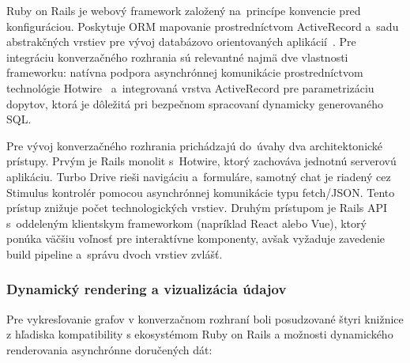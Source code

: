 Ruby on Rails je webový framework založený na~princípe konvencie pred
konfiguráciou. Poskytuje ORM mapovanie prostredníctvom ActiveRecord a~sadu abstrakčných
vrstiev pre vývoj databázovo orientovaných aplikácií~\cite{ruby2025, hartl2022railstutorial}.
Pre integráciu konverzačného rozhrania sú relevantné najmä dve vlastnosti
frameworku: natívna podpora asynchrónnej komunikácie prostredníctvom technológie Hotwire~\cite{hotwire2021}
a~integrovaná vrstva ActiveRecord pre parametrizáciu dopytov, ktorá je dôležitá
pri bezpečnom spracovaní dynamicky generovaného SQL.

Pre vývoj konverzačného rozhrania prichádzajú do~úvahy dva architektonické
prístupy. Prvým je Rails monolit s~Hotwire, ktorý zachováva jednotnú serverovú
aplikáciu. Turbo Drive rieši navigáciu a~formuláre, samotný chat je riadený cez
Stimulus kontrolér pomocou asynchrónnej komunikácie typu fetch/JSON. Tento prístup
znižuje počet technologických vrstiev. Druhým prístupom je Rails API s~oddeleným
klientskym frameworkom (napríklad React alebo Vue), ktorý ponúka väčšiu voľnosť pre
interaktívne komponenty, avšak vyžaduje zavedenie build pipeline a~správu dvoch
vrstiev zvlášť.

\subsubsection{Dynamický rendering a vizualizácia údajov}

Pre vykresľovanie grafov v konverzačnom rozhraní boli posudzované štyri knižnice z
hľadiska kompatibility s ekosystémom Ruby on Rails a možnosti dynamického renderovania
asynchrónne doručených dát:

